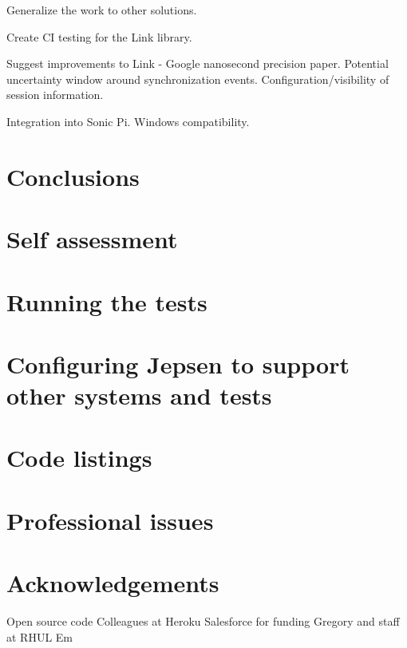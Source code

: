 \documentclass[11pt]{article} %
\theoremstyle{plain}
\theoremstyle{definition}
\begin{document}
Generalize the work to other solutions.

Create CI testing for the Link library.

Suggest improvements to Link - Google nanosecond precision paper. Potential
uncertainty window around synchronization events. Configuration/visibility of
session information.

Integration into Sonic Pi. Windows compatibility.

\section{Conclusions}




\appendix
\section{Self assessment}
\section{Running the tests}
\section{Configuring Jepsen to support other systems and tests}
\section{Code listings}
\section{Professional issues}
\section{Acknowledgements}

Open source code
Colleagues at Heroku
Salesforce for funding
Gregory and staff at RHUL
Em
\end{document}

